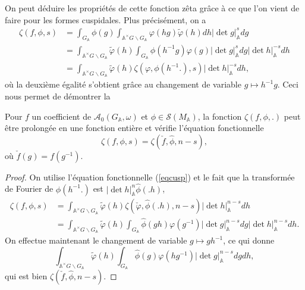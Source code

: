 On peut déduire les propriétés de cette fonction zêta grâce à ce que l'on vient de faire pour les formes cuspidales. Plus précisément, on a
\begin{align}
\zeta(f, \phi, s) &= \int_{G_\mathbb{A}}\phi(g)\int_{\mathbb{A}^\times G \backslash G_\mathbb{A}} \varphi(hg) \tilde{\varphi}(h) dh |\det g|_\mathbb{A}^s dg \\
&= \int_{\mathbb{A}^\times G \backslash G_\mathbb{A}} \tilde{\varphi}(h) \int_{G_\mathbb{A}}\phi(h^{-1}g)\varphi(g)|\det g|_\mathbb{A}^s dg |\det h|_\mathbb{A}^{-s} dh \\
&= \int_{\mathbb{A}^\times G \backslash G_\mathbb{A}} \tilde{\varphi}(h) \zeta(\varphi, \phi(h^{-1}.), s)|\det h|_\mathbb{A}^{-s} dh,
\end{align}
où la deuxième égalité s'obtient grâce au changement de variable $g \mapsto h^{-1}g$. Ceci nous permet de démontrer la
\begin{proposition}
\label{zetacusp}
Pour $f$ un coefficient de $\mathcal{A}_0(G_\mathbb{A}, \omega)$ et $\phi \in \mathcal{S}(M_\mathbb{A})$, la fonction $\zeta(f, \phi, .)$ peut être prolongée en une fonction entière et vérifie l'équation fonctionnelle
\begin{equation}
\zeta(f, \phi, s) = \zeta(\check{f}, \hat{\phi}, n-s),
\end{equation}
où $\check{f}(g) = f(g^{-1})$.
\end{proposition}

\begin{proof}
On utilise l'équation fonctionnelle (\ref{eqcusp}) et le fait que la transformée de Fourier de $\phi(h^{-1}.)$ est $|\det h|_\mathbb{A}^n\hat{\phi}(.h)$,
\begin{align}
\zeta(f, \phi, s) &= \int_{\mathbb{A}^\times G \backslash G_\mathbb{A}} \tilde{\varphi}(h) \zeta(\check{\varphi}, \hat{\phi}(.h), n-s)|\det h|_\mathbb{A}^{n-s} dh \\
&= \int_{\mathbb{A}^\times G \backslash G_\mathbb{A}} \tilde{\varphi}(h) \int_{G_\mathbb{A}}\hat{\phi}(gh)\varphi(g^{-1})|\det g|_\mathbb{A}^{n-s} dg |\det h|_\mathbb{A}^{n-s} dh.
\end{align}
On effectue maintenant le changement de variable $g \mapsto gh^{-1}$, ce qui donne
\begin{equation}
\int_{\mathbb{A}^\times G \backslash G_\mathbb{A}} \tilde{\varphi}(h) \int_{G_\mathbb{A}}\hat{\phi}(g)\varphi(hg^{-1})|\det g|_\mathbb{A}^{n-s} dg dh,
\end{equation}
qui est bien $\zeta(\check{f}, \hat{\phi}, n-s)$.
\end{proof}

